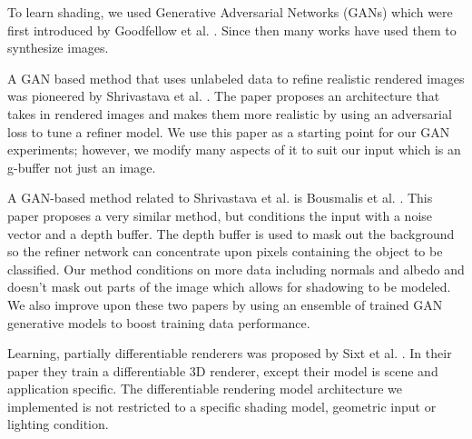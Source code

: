 \documentclass[10pt,twocolumn,letterpaper]{article}
\begin{document}

To learn shading, we used Generative Adversarial Networks (GANs) which were first introduced by Goodfellow et al. \cite{goodfellow}. Since then many works have used them to synthesize images. 


A GAN based method that uses unlabeled data to refine realistic rendered images was pioneered by
Shrivastava et al. \cite{DBLP:journals/corr/ShrivastavaPTSW16}. The paper proposes an architecture that takes in rendered images and makes them more realistic by using an adversarial loss to tune a refiner model. We use this paper as a starting point for our GAN experiments; however, we modify many aspects of it to suit our input which is an g-buffer not just an image.

A GAN-based method related to Shrivastava et al. is Bousmalis et al. \cite{Bousmalis2016UnsupervisedPD}. This paper proposes a very similar method, but conditions the input with a noise vector and a depth buffer.  The depth buffer is used to mask out the background so the refiner network can concentrate upon pixels containing the object to be classified.  Our method conditions on more data including normals and albedo and doesn't mask out parts of the image which allows for shadowing to be modeled. We also improve upon these two papers by using an ensemble of trained GAN generative models to boost training data performance.

Learning, partially differentiable renderers was proposed by Sixt et al. \cite{DBLP:journals/corr/SixtWL17}. In their paper they train a differentiable 3D renderer, except their model is scene and application specific. The differentiable rendering model architecture we implemented is not restricted to a specific shading model, geometric input or lighting condition.
\end{document}
